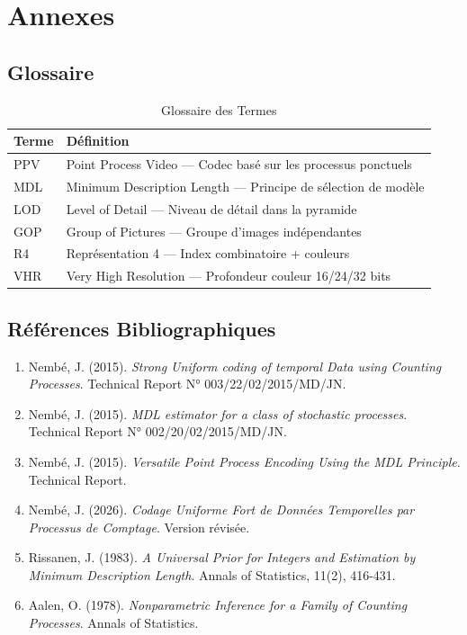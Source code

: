 \documentclass[12pt,a4paper]{article}
\begin{document}
	\section{Annexes}
	\label{sec:annexes}
	
	\subsection{Glossaire}
	\label{subsec:glossaire}
	
	\begin{table}[h]
		\centering
		\caption{Glossaire des Termes}
		\label{tab:glossaire}
		\begin{tabular}{@{}lp{10cm}@{}}
			\toprule
			\textbf{Terme} & \textbf{Définition} \\
			\midrule
			PPV & Point Process Video — Codec basé sur les processus ponctuels \\
			MDL & Minimum Description Length — Principe de sélection de modèle \\
			LOD & Level of Detail — Niveau de détail dans la pyramide \\
			GOP & Group of Pictures — Groupe d'images indépendantes \\
			R4 & Représentation 4 — Index combinatoire + couleurs \\
			VHR & Very High Resolution — Profondeur couleur 16/24/32 bits \\
			\bottomrule
		\end{tabular}
	\end{table}
	
	\subsection{Références Bibliographiques}
	\label{subsec:references}
	
	\begin{enumerate}
		\item Nembé, J. (2015). \textit{Strong Uniform coding of temporal Data using Counting Processes}. Technical Report N° 003/22/02/2015/MD/JN.
		\item Nembé, J. (2015). \textit{MDL estimator for a class of stochastic processes}. Technical Report N° 002/20/02/2015/MD/JN.
		\item Nembé, J. (2015). \textit{Versatile Point Process Encoding Using the MDL Principle}. Technical Report.
		\item Nembé, J. (2026). \textit{Codage Uniforme Fort de Données Temporelles par Processus de Comptage}. Version révisée.
		\item Rissanen, J. (1983). \textit{A Universal Prior for Integers and Estimation by Minimum Description Length}. Annals of Statistics, 11(2), 416-431.
		\item Aalen, O. (1978). \textit{Nonparametric Inference for a Family of Counting Processes}. Annals of Statistics.
	\end{enumerate}
	
\end{document}
